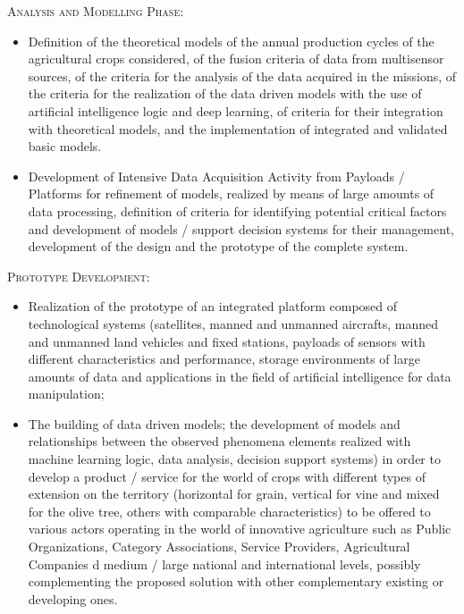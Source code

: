 \documentclass[comsoc,final]{IEEEtran}
\begin{document}
\textsc{Analysis and Modelling Phase:}

\begin{itemize}
\item Definition of the theoretical models of the annual production cycles of the agricultural crops considered, of the fusion criteria of data from multisensor sources, of the criteria for the analysis of the data acquired in the missions, of the criteria for the realization of the data driven models with the use of artificial intelligence logic and deep learning, of criteria for their integration with theoretical models, and the implementation of integrated and validated basic models.
\item Development of Intensive Data Acquisition Activity from Payloads / Platforms for refinement of models, realized by means of large amounts of data processing, definition of criteria for identifying potential critical factors and development of models / support decision systems for their management, development of the design and the prototype of the complete system.
\end{itemize}

\textsc{Prototype Development:}

\begin{itemize}
\item Realization of the prototype of an integrated platform composed of technological systems (satellites, manned and unmanned aircrafts, manned and unmanned land vehicles and fixed stations, payloads of sensors with different characteristics and performance, storage environments of large amounts of data and applications in the field of artificial intelligence for data manipulation;
\item The building of data driven models; the development of models and relationships between the observed phenomena elements realized with machine learning logic, data analysis, decision support systems) in order to develop a product / service for the world of crops with different types of extension on the territory (horizontal for grain, vertical for vine and mixed for the olive tree, others with comparable characteristics) to be offered to various actors operating in the world of innovative agriculture such as Public Organizations, Category Associations, Service Providers, Agricultural Companies d medium / large national and international levels, possibly complementing the proposed solution with other complementary existing or developing ones.
\end{itemize}
\end{document}
